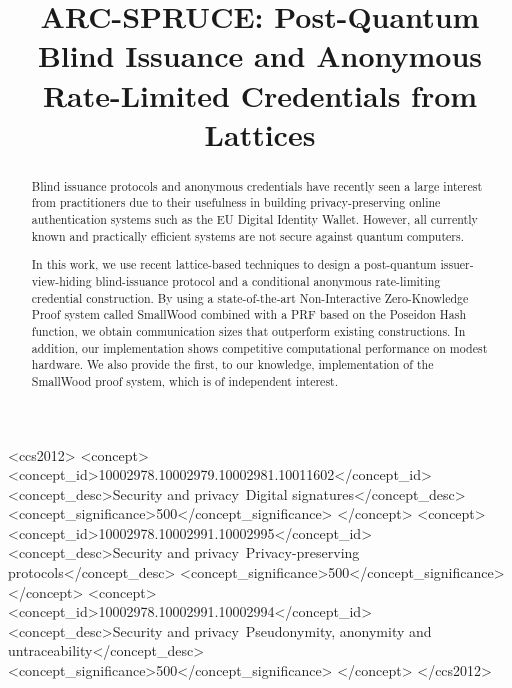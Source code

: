 \documentclass[sigconf]{acmart}
\begin{document}
\title{ARC-SPRUCE: Post-Quantum Blind Issuance and Anonymous Rate-Limited Credentials from Lattices}



\begin{CCSXML}
<ccs2012>
<concept>
<concept_id>10002978.10002979.10002981.10011602</concept_id>
<concept_desc>Security and privacy~Digital signatures</concept_desc>
<concept_significance>500</concept_significance>
</concept>
<concept>
<concept_id>10002978.10002991.10002995</concept_id>
<concept_desc>Security and privacy~Privacy-preserving protocols</concept_desc>
<concept_significance>500</concept_significance>
</concept>
<concept>
<concept_id>10002978.10002991.10002994</concept_id>
<concept_desc>Security and privacy~Pseudonymity, anonymity and untraceability</concept_desc>
<concept_significance>500</concept_significance>
</concept>
</ccs2012>
\end{CCSXML}




\begin{abstract}
Blind issuance protocols and anonymous credentials have recently seen a large interest from practitioners due to their usefulness in building privacy-preserving online authentication systems such as the EU Digital Identity Wallet. However, all currently known and practically efficient systems are not secure against quantum computers.

In this work, we use recent lattice-based techniques to design a post-quantum issuer-view-hiding blind-issuance protocol and a conditional anonymous rate-limiting credential construction. By using a state-of-the-art Non-Interactive Zero-Knowledge Proof system called SmallWood combined with a PRF based on the Poseidon Hash function, we obtain communication sizes that outperform existing constructions. In addition, our implementation shows competitive computational performance on modest hardware. We also provide the first, to our knowledge, implementation of the SmallWood proof system, which is of independent interest.
\end{abstract}

\maketitle











\appendix






\end{document}
